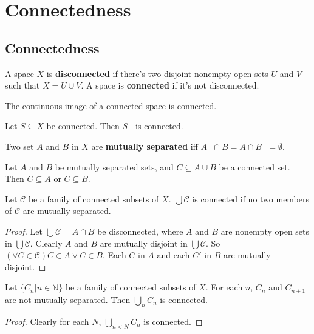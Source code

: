 \documentclass[12pt]{book}
\begin{document}
\chapter{Connectedness}

\section{Connectedness}
\begin{definition}
	A space $X$ is {\bf disconnected} if there's two disjoint nonempty open sets $U$ and $V$ such that $X=U\cup V$. A space is {\bf connected} if it's not disconnected.
\end{definition}

\begin{lemma}
	The continuous image of a connected space is connected.
\end{lemma}

\begin{lemma}
	Let $S\subseteq X$ be connected. Then $S^-$ is connected.
\end{lemma}

\begin{definition}
	Two set $A$ and $B$ in $X$ are {\bf mutually separated} iff $A^-\cap B=A\cap B^-=\emptyset$.
\end{definition}

\begin{lemma}
	Let $A$ and $B$ be mutually separated sets, and $C\subseteq A\cup B$ be a connected set. Then $C\subseteq A$ or $C\subseteq B$.
\end{lemma}

\begin{lemma}
	Let $\mathcal C$ be a family of connected subsets of $X$. $\bigcup \mathcal C$ is connected if no two members of $\mathcal C$ are mutually separated.
\end{lemma}
\begin{proof}
	Let $\bigcup \mathcal C=A\cap B$ be disconnected, where $A$ and $B$ are nonempty open sets in $\bigcup \mathcal C$. Clearly $A$ and $B$ are mutually disjoint in $\bigcup \mathcal C$. So $(\forall C\in\mathcal C)C\in A\vee C\in B$. Each $C$ in $A$ and each $C'$ in $B$ are mutually disjoint.
\end{proof}

\begin{corollary}
	Let $\{C_n|n\in\mathbb N\}$ be a family of connected subsets of $X$. For each $n$, $C_n$ and $C_{n+1}$ are not mutually separated. Then $\bigcup_nC_n$ is connected.
\end{corollary}
\begin{proof}
	Clearly for each $N$, $\bigcup_{n<N}C_n$ is connected.
\end{proof}
\end{document}
